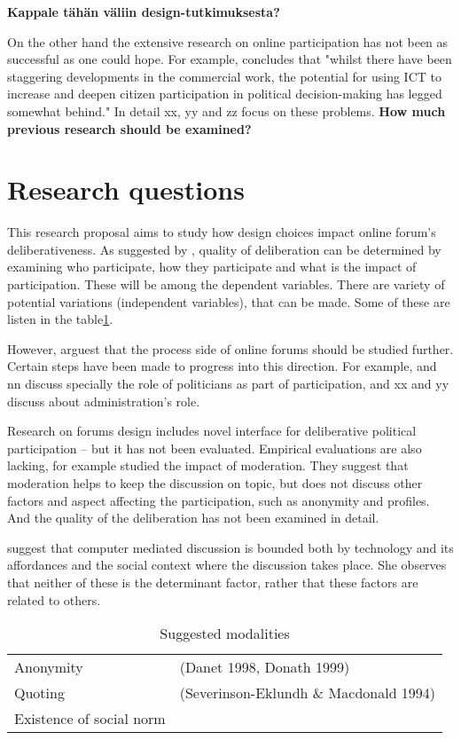 \documentclass[journal,a4paper]{IEEEtran}
\begin{document}
\textbf{Kappale tähän väliin design-tutkimuksesta?}

On the other hand the extensive research on online participation has not been as successful as one could hope. For example,  concludes that "whilst there have been staggering developments in the commercial work, the potential for using ICT to increase and deepen citizen participation in political decision-making has legged somewhat behind." In detail xx, yy and zz focus on these problems. \textbf{How much previous research should be examined?}

\section{Research questions}

This research proposal aims to study how design choices impact online forum's deliberativeness. As suggested by , quality of deliberation can be determined by examining who participate, how they participate and what is the impact of participation. These will be among the dependent variables. There are variety of potential variations (independent variables), that can be made. Some of these are listen in the table\ref{tab:modalities}.

However,  arguest that the process side of online forums should be studied further. Certain steps have been made to progress into this direction. For example,  and nn discuss specially the role of politicians as part of participation, and xx and yy discuss about administration's role.

Research on forums design includes  novel interface for deliberative political participation -- but it has not been evaluated. Empirical evaluations are also lacking, for example  studied the impact of moderation. They suggest that moderation helps to keep the discussion on topic, but does not discuss other factors and aspect affecting the participation, such as anonymity and profiles. And the quality of the deliberation has not been examined in detail.

 suggest that computer mediated discussion is bounded both by technology and its affordances and the social context where the discussion takes place. She observes that neither of these is the determinant factor, rather that these factors are related to others.

\begin{table}
\caption{Suggested modalities}
\begin{tabular}{ll}
Anonymity & (Danet 1998, Donath 1999)  \\ 
Quoting & (Severinson-Eklundh \& Macdonald 1994) \\ 
Existence of social norm & \cite{sukumaran11} \\
\end{tabular} 
\label{tab:modalities}
\end{table}
\end{document}
